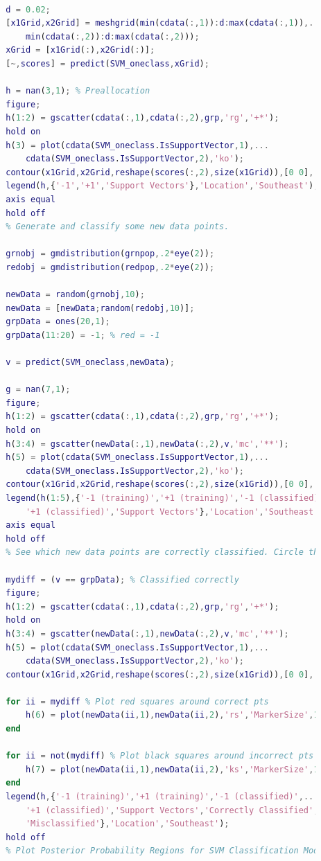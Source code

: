 \begin{lstlisting}[language = Matlab]
        % Plot the classification boundaries. To visualize the support vector classifier, predict scores over a grid.

        d = 0.02;
        [x1Grid,x2Grid] = meshgrid(min(cdata(:,1)):d:max(cdata(:,1)),...
            min(cdata(:,2)):d:max(cdata(:,2)));
        xGrid = [x1Grid(:),x2Grid(:)];
        [~,scores] = predict(SVM_oneclass,xGrid);

        h = nan(3,1); % Preallocation
        figure;
        h(1:2) = gscatter(cdata(:,1),cdata(:,2),grp,'rg','+*');
        hold on
        h(3) = plot(cdata(SVM_oneclass.IsSupportVector,1),...
            cdata(SVM_oneclass.IsSupportVector,2),'ko');
        contour(x1Grid,x2Grid,reshape(scores(:,2),size(x1Grid)),[0 0],'k');
        legend(h,{'-1','+1','Support Vectors'},'Location','Southeast');
        axis equal
        hold off
        % Generate and classify some new data points.

        grnobj = gmdistribution(grnpop,.2*eye(2));
        redobj = gmdistribution(redpop,.2*eye(2));

        newData = random(grnobj,10);
        newData = [newData;random(redobj,10)];
        grpData = ones(20,1);
        grpData(11:20) = -1; % red = -1

        v = predict(SVM_oneclass,newData);

        g = nan(7,1);
        figure;
        h(1:2) = gscatter(cdata(:,1),cdata(:,2),grp,'rg','+*');
        hold on
        h(3:4) = gscatter(newData(:,1),newData(:,2),v,'mc','**');
        h(5) = plot(cdata(SVM_oneclass.IsSupportVector,1),...
            cdata(SVM_oneclass.IsSupportVector,2),'ko');
        contour(x1Grid,x2Grid,reshape(scores(:,2),size(x1Grid)),[0 0],'k');
        legend(h(1:5),{'-1 (training)','+1 (training)','-1 (classified)',...
            '+1 (classified)','Support Vectors'},'Location','Southeast');
        axis equal
        hold off
        % See which new data points are correctly classified. Circle the correctly classified points in red, and the incorrectly classified points in black.

        mydiff = (v == grpData); % Classified correctly
        figure;
        h(1:2) = gscatter(cdata(:,1),cdata(:,2),grp,'rg','+*');
        hold on
        h(3:4) = gscatter(newData(:,1),newData(:,2),v,'mc','**');
        h(5) = plot(cdata(SVM_oneclass.IsSupportVector,1),...
            cdata(SVM_oneclass.IsSupportVector,2),'ko');
        contour(x1Grid,x2Grid,reshape(scores(:,2),size(x1Grid)),[0 0],'k');

        for ii = mydiff % Plot red squares around correct pts
            h(6) = plot(newData(ii,1),newData(ii,2),'rs','MarkerSize',12);
        end

        for ii = not(mydiff) % Plot black squares around incorrect pts
            h(7) = plot(newData(ii,1),newData(ii,2),'ks','MarkerSize',12);
        end
        legend(h,{'-1 (training)','+1 (training)','-1 (classified)',...
            '+1 (classified)','Support Vectors','Correctly Classified',...
            'Misclassified'},'Location','Southeast');
        hold off
        % Plot Posterior Probability Regions for SVM Classification Models
        \end{lstlisting}
